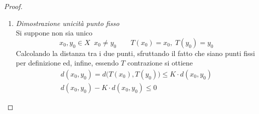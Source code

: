 \begin{theorem}
\begin{proof}
\begin{enumerate}
				La successione $x$ definita in \cref{eq:teo_contraz_succ}, essendo stata dimostrata di Cauchy nel passo precedente, per  ammette sicuramente $\lim\limits_{n \to +\infty} x_n = x_* \in X$. Inoltre
				\[
					T \text{ Contrazione}
					\quad \overset{
						\mathclap{
							\rule[-\baselineskip]{0pt}{\baselineskip}
							\text{
								\begin{tabular}{c}
									Come da\\[-1ex]
									\fullref{def:contrazione}
								\end{tabular}
							}
						}
					}{\implies} \quad T \text{ Lipschitziana}
					\quad \overset{
						\mathclap{
							\rule[-\baselineskip]{0pt}{\baselineskip}
							\text{
								\begin{tabular}{c}
									Per\\[-1ex]
									\fullref{prop:se_lips_allora_unif_cont}
								\end{tabular}
							}
						}
					}{\implies} \quad T \text{ Unif. Cont.}
					\quad \overset{
						\mathclap{
							\rule[-\baselineskip]{0pt}{\baselineskip}
							\text{
								\begin{tabular}{c}
									Per\\[-1ex]
									\fullref{prop:if_unif_cont_then_conf}
								\end{tabular}
							}
						}
					}{\implies} \quad T \text{ Continua}
				\]
				Posto quindi
				\begin{align*}
					T(x_*) &= T \bigl( \; \lim\limits_{n \to +\infty} x_n \; \bigr)
					\shortintertext{Grazie alla continuità di $T$}
					&= \lim\limits_{n \to +\infty} \bigl(T(x_n)\bigr)
					\shortintertext{Dunque, per come è definita $x$}
					&= \lim\limits_{n \to +\infty} ( x_{n+1} )\\
					&= x_*
				\end{align*}
				\qed
			\item \textit{Dimostrazione unicità punto fisso}\\
				Si suppone non sia unico
				\[x_0, y_0 \in X \;\; x_0 \neq y_0 \qquad T(x_0) = x_0,\; T(y_0) = y_0\]
				Calcolando la distanza tra i due punti, sfruttando il fatto che siano punti fissi per definizione ed, infine, essendo $T$ contrazione si ottiene
				\begin{equation*}
					\begin{gathered}
						d(x_0, y_0) = d\bigl( T(x_0), T(y_0) \bigr) \leq K \cdot d(x_0, y_0)\\
						d(x_0, y_0) - K \cdot d(x_0, y_0) \leq 0

\end{gathered}
\end{equation*}
\end{enumerate}
\end{proof}
\end{theorem}
